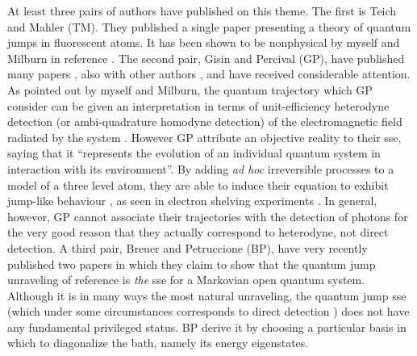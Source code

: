 At least three pairs of authors have published on this theme. The first is Teich and
Mahler (TM). They published a single paper \cite{TeiMah92} presenting a theory of
quantum jumps in fluorescent atoms. It has been shown to be nonphysical by
myself and Milburn in reference \cite{WisMil93c}. The second pair, Gisin  and
Percival (GP), have published many papers \cite{GisPer92a,GisPer92b,GisPer93}, also
with other authors \cite{Gis93}, and have received considerable attention.
As pointed out by myself and Milburn,
the quantum trajectory which GP consider can be given an interpretation
in terms of unit-efficiency heterodyne detection (or ambi-quadrature homodyne
detection) of the electromagnetic field radiated by the system \cite{WisMil93c}.
However GP  attribute an objective reality to their {\sc sse}, saying that
it ``represents the evolution 
of an individual quantum system in interaction with its environment''. 
By adding {\em ad hoc} irreversible processes to a model of a three 
level atom, they are able to induce their equation to exhibit  
jump-like behaviour \cite{Gis93}, as seen in electron shelving 
experiments \cite{Coo88}. In general, 
however, GP cannot associate their trajectories with the detection of  
photons for the very good reason that they actually correspond to heterodyne, 
not direct detection. A third pair, Breuer and Petruccione (BP), have very recently 
published two papers  \cite{BrePet95a,BrePet95b} in which they claim to show that the
quantum jump  unraveling of reference \cite{GarParZol92} is {\em the} {\sc sse} for
a Markovian open quantum system. Although it is in many ways the most natural 
unraveling, the quantum jump {\sc sse} (which under some circumstances corresponds
to direct detection \cite{GarParZol92,WisMil93c}) does not have any fundamental
privileged status. BP derive it by choosing a particular basis in which to
diagonalize the bath, namely its energy eigenstates.

